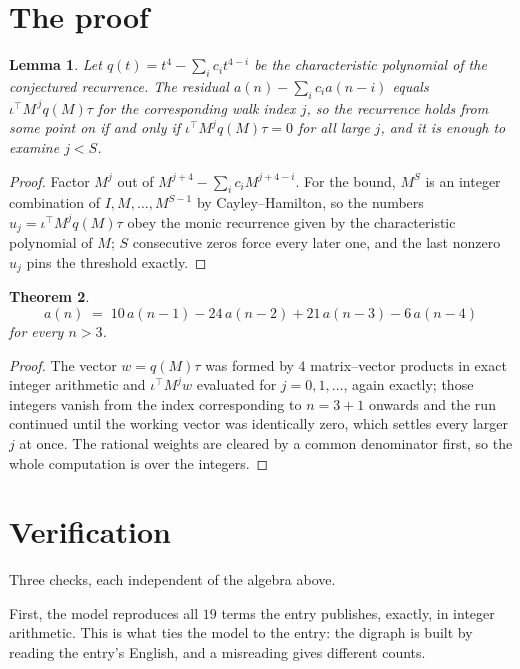 \documentclass[11pt,a4paper]{article}
\theoremstyle{plain}
\newtheorem{theorem}{Theorem}
\newtheorem{lemma}[theorem]{Lemma}
\theoremstyle{definition}
\begin{document}
\section{The proof}

\begin{lemma}\label{lem:crit}
Let $q(t)=t^{4}-\sum_i c_it^{4-i}$ be the characteristic polynomial of the
conjectured recurrence. The residual $a(n)-\sum_ic_ia(n-i)$ equals
$\iota^{\!\top}M^{\,j}q(M)\tau$ for the corresponding walk index $j$, so the recurrence
holds from some point on if and only if $\iota^{\!\top}M^{j}q(M)\tau=0$ for all large $j$,
and it is enough to examine $j<S$.
\end{lemma}

\begin{proof}
Factor $M^{j}$ out of $M^{j+4}-\sum_ic_iM^{j+4-i}$. For the bound, $M^{S}$
is an integer combination of $I,M,\dots,M^{S-1}$ by Cayley--Hamilton, so the numbers
$u_j=\iota^{\!\top}M^{j}q(M)\tau$ obey the monic recurrence given by the characteristic
polynomial of $M$; $S$ consecutive zeros force every later one, and the last nonzero $u_j$
pins the threshold exactly.
\end{proof}

\begin{theorem}
\[
a(n)\;=\;10\,a(n-1) - 24\,a(n-2) + 21\,a(n-3) - 6\,a(n-4)
\]
for every $n>3$.
\end{theorem}

\begin{proof}
The vector $w=q(M)\tau$ was formed by $4$ matrix--vector products in exact integer
arithmetic and $\iota^{\!\top}M^{j}w$ evaluated for $j=0,1,\dots$, again exactly; those
integers vanish from the index corresponding to $n=3+1$ onwards and the run continued
until the working vector was identically zero, which settles every larger $j$ at once. The
rational weights are cleared by a common denominator first, so the whole computation is over
the integers.
\end{proof}

\section{Verification}

Three checks, each independent of the algebra above.

First, the model reproduces all $19$ terms the entry publishes, exactly, in integer
arithmetic. This is what ties the model to the entry: the digraph is built by reading the
entry's English, and a misreading gives different counts.
\end{document}
